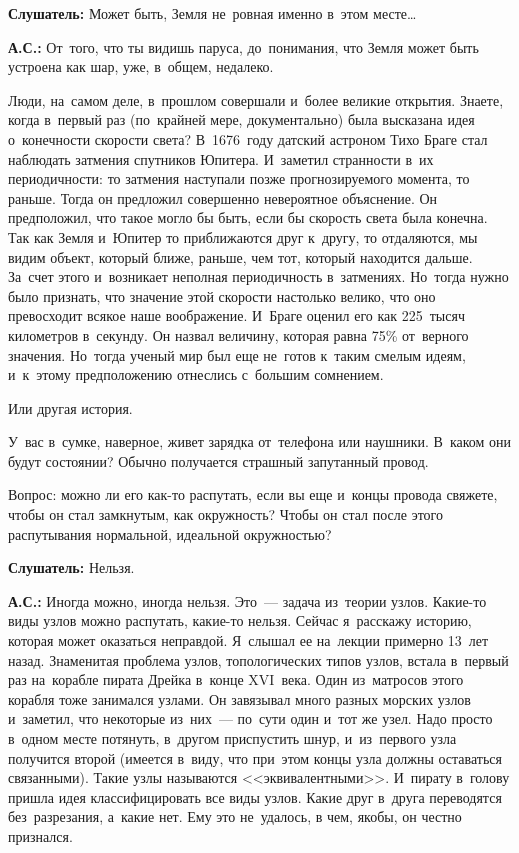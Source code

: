 \textbf{Слушатель:} Может быть, Земля не~ровная именно в~этом месте\ldots

\textbf{А.С.:} От~того, что ты видишь паруса, до~понимания, что Земля может быть устроена как шар,
уже, в~общем, недалеко.

Люди, на~самом деле, в~прошлом совершали и~более великие открытия. Знаете, когда в~первый раз
(по~крайней мере, документально) была высказана идея о~конечности скорости света? В~1676~году
датский астроном Тихо Браге стал наблюдать затмения спутников Юпитера. И~заметил странности в~их
периодичности: то затмения наступали позже прогнозируемого момента, то раньше.
 Тогда он предложил совершенно невероятное
объяснение. Он предположил, что такое могло бы быть, если бы скорость света была конечна. Так как
Земля и~Юпитер то приближаются друг к~другу, то отдаляются, мы видим объект, который ближе, раньше,
чем тот, который находится дальше. За~счет этого и~возникает неполная периодичность в~затмениях.
Но~тогда нужно было признать, что значение этой скорости настолько велико, что оно превосходит
всякое наше воображение. И~Браге оценил его как 225~тысяч километров в~секунду. Он назвал величину,
которая равна 75\% от~верного значения. Но~тогда ученый мир был еще не~готов к~таким смелым идеям,
и~к~этому предположению отнеслись с~большим сомнением.

Или другая история.

У~вас в~сумке, наверное, живет зарядка от~телефона или наушники. В~каком они будут состоянии?
Обычно получается страшный запутанный провод.

Вопрос: можно ли его как-то распутать, если вы еще и~концы провода свяжете, чтобы он стал
замкнутым, как окружность? Чтобы он стал после этого распутывания нормальной, идеальной
окружностью?

\textbf{Слушатель:} Нельзя.


\textbf{А.С.:} Иногда можно, иногда нельзя. Это~--- задача из~теории узлов. Какие-то виды узлов можно
распутать, какие-то нельзя. Сейчас я~расскажу историю, которая может оказаться неправдой. Я~слышал
ее на~лекции примерно 13~лет назад. Знаменитая проблема узлов, топологических типов узлов, встала
в~первый раз на~корабле пирата Дрейка в~конце XVI~века. Один из~матросов этого корабля тоже
занимался узлами. Он завязывал много разных морских узлов и~заметил, что некоторые из~них~---
по~сути один и~тот же узел. Надо просто в~одном месте потянуть, в~другом приспустить шнур,
и~из~первого узла получится второй (имеется в~виду, что при~этом концы узла должны оставаться
связанными). Такие узлы называются <<эквивалентными>>. И~пирату в~голову пришла идея
классифицировать все виды узлов. Какие друг в~друга переводятся без~разрезания, а~какие нет.
Ему это не~удалось, в чем, якобы, он честно признался.

